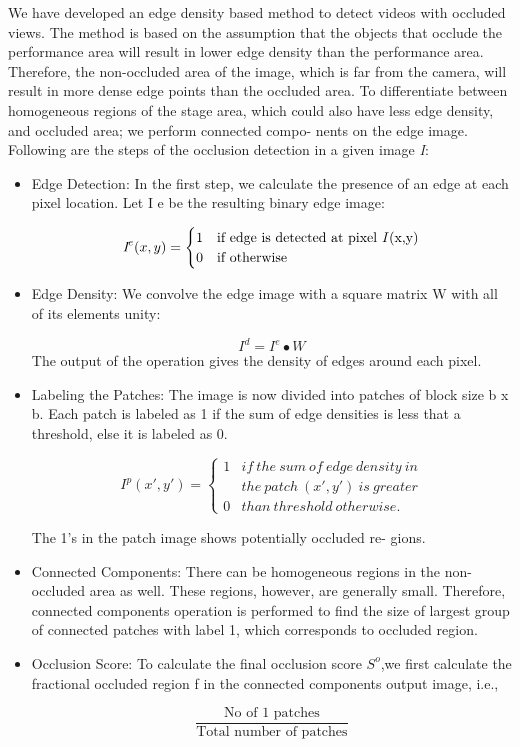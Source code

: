 \documentclass{sig-alternate}
\begin{document}
We have developed an edge density based method to detect videos
with occluded views. The method is based on the assumption that
the objects that occlude the performance area will result in lower
edge density than the performance area. Therefore, the non-occluded
area of the image, which is far from the camera, will result in more
dense edge points than the occluded area. To differentiate between
homogeneous regions of the stage area, which could also have less
edge density, and occluded area; we perform connected compo-
nents on the edge image. Following are the steps of the occlusion
detection in a given image \textit{I}:
\begin{itemize}
\item Edge Detection: In the first step, we calculate the presence of
an edge at each pixel location. Let I e be the resulting binary
edge image:

\[
\textit{I}^e(x,y) =
\begin{cases}
                           1 & \text{if edge is detected at pixel \textit{I}(x,y)} \\
                               0 & \text{if otherwise} 
\end{cases}
\]


\item Edge Density: We convolve the edge image with a square
matrix W with all of its elements unity:

\begin{displaymath}{\textit{I}^d = \textit{I}^e \bullet W} \end{displaymath}
The output of the operation gives the density of edges around
each pixel.
\item Labeling the Patches: The image is now divided into patches
of block size b x b. Each patch is labeled as 1 if the sum of
edge densities is less that a threshold, else it is labeled as 0.

\[I^p(x',y') = \left\{\begin{matrix} 1 & if\ the\ sum\ of\ edge\ density\ in \\ & the\ patch\ (x',y')\ is\ greater\\ 0& than\ threshold\ otherwise. \end{matrix}\right.\]

The 1's in the patch image shows potentially occluded re-
gions.
\item Connected Components: There can be homogeneous regions in the non-occluded area as well. These regions, however, are generally small. Therefore, connected components operation is performed to find the size of largest group of connected patches with label 1, which corresponds to occluded region.
\item Occlusion Score: To calculate the final occlusion score $S^o$,we first calculate the fractional occluded region f in the connected components output image, i.e.,

\begin{displaymath}{\frac{\text{No of 1 patches}}{\text{Total number of patches}}}\end{displaymath}
\end{itemize}
\end{document}

